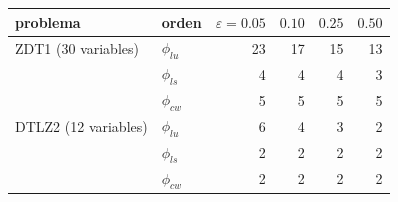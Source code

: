 \begin{tabular}{llrrrr}
\toprule
problema & orden & $\varepsilon = 0.05$ & $0.10$ & $0.25$ & $0.50$ \\
\midrule
ZDT1 (30 variables) & $\phi_{lu}$ & 23 & 17 & 15 & 13 \\
 & $\phi_{ls}$ & 4 & 4 & 4 & 3 \\
 & $\phi_{cw}$ & 5 & 5 & 5 & 5 \\
\addlinespace
DTLZ2 (12 variables) & $\phi_{lu}$ & 6 & 4 & 3 & 2 \\
 & $\phi_{ls}$ & 2 & 2 & 2 & 2 \\
 & $\phi_{cw}$ & 2 & 2 & 2 & 2 \\
\bottomrule
\end{tabular}
